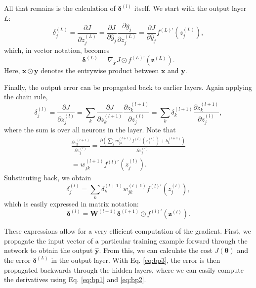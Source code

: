 All that remains is the calculation of $\bm{\delta}^{(l)}$ itself. We start with the output layer $L$:
\begin{equation}
\delta_j^{(L)} = \frac{\partial J}{\partial z_j^{(L)}}
= \frac{\partial J}{\partial \hat{y}_j} \frac{\partial \hat{y}_j}{\partial z_j^{(L)}}
= \frac{\partial J}{\partial \hat{y}_j} f^{(L)\prime}\left (z_j^{(L)}\right ),
\end{equation}
which, in vector notation, becomes
\begin{equation}
\bm{\delta}^{(L)} = \nabla_{\hat{\bm{y}}}J \odot f^{(L)\prime}\left (\bm{z}^{(L)}\right ).
\end{equation}
Here, $\bm{x} \odot \bm{y}$ denotes the entrywise product between $\bm{x}$ and $\bm{y}$.

Finally, the output error can be propagated back to earlier layers. Again applying the chain rule,
\begin{equation}
\delta_j^{(l)} = \frac{\partial J}{\partial z_j^{(l)}}
= \sum_k \frac{\partial J}{\partial z_k^{(l+1)}} \frac{\partial z_k^{(l+1)}}{\partial z_j^{(l)}}
= \sum_k \delta_k^{(l+1)} \frac{\partial z_k^{(l+1)}}{\partial z_j^{(l)}},
\end{equation}
where the sum is over all neurons in the  layer. Note that
\begin{equation}
\begin{gathered}
\frac{\partial z_k^{(l+1)}}{\partial z_j^{(l)}}
= \frac{\partial\left (
	\sum_j w_{jk}^{(l+1)}f^{(l)}\left (z_j^{(l)}\right )+b_k^{(l+1)}
	\right )}{\partial z_j^{(l)}}\\
= w_{jk}^{(l+1)}f^{(l)\prime}\left (z_j^{(l)}\right ).
\end{gathered}
\end{equation}
Substituting back, we obtain
\begin{equation}
\delta_j^{(l)} = \sum_k \delta_k^{(l+1)} w_{jk}^{(l+1)}f^{(l)\prime}\left (z_j^{(l)}\right ),
\end{equation}
which is easily expressed in matrix notation:
\begin{equation}\label{eq:bp3}
\bm{\delta}^{(l)} = \bm{W}^{(l+1)} \bm{\delta}^{(l+1)} \odot f^{(l)\prime}\left (\bm{z}^{(l)}\right ).
\end{equation}

These expressions allow for a very efficient computation of the gradient. First, we propagate the input vector of a particular training example forward through the network to obtain the output $\hat{\bm{y}}$. From this, we can calculate the cost $J(\bm{\theta})$ and the error $\bm{\delta}^{(L)}$ in the output layer. With Eq. \eqref{eq:bp3}, the error is then propagated backwards through the hidden layers, where we can easily compute the derivatives using Eq. \eqref{eq:bp1} and \eqref{eq:bp2}.

